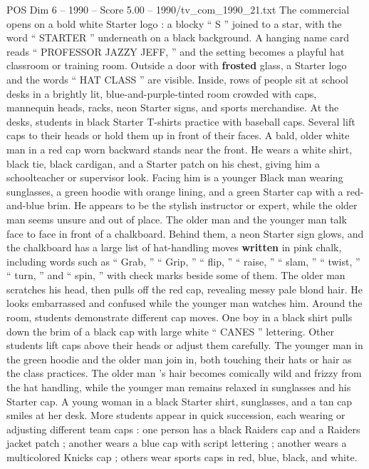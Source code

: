 \begin{textsample}{POS Dim 6 – 1990 – Score 5.00 – 1990/tv\_com\_1990\_21.txt}  \label{ex:f6_pos_080}
The commercial opens on a bold white Starter logo : a blocky “ S ” joined to a star, with the word “ STARTER ” underneath on a black background.
A hanging name card reads “ PROFESSOR JAZZY JEFF, ” and the setting becomes a playful hat classroom or training room.
Outside a door with \textbf{frosted} glass, a Starter logo and the words “ HAT CLASS ” are visible.
Inside, rows of people sit at school desks in a brightly lit, blue-and-purple-tinted room crowded with caps, mannequin heads, racks, neon Starter signs, and sports merchandise.
At the desks, students in black Starter T-shirts practice with baseball caps.
Several lift caps to their heads or hold them up in front of their faces.
A bald, older white man in a red cap worn backward stands near the front.
He wears a white shirt, black tie, black cardigan, and a Starter patch on his chest, giving him a schoolteacher or supervisor look.
Facing him is a younger Black man wearing sunglasses, a green hoodie with orange lining, and a green Starter cap with a red-and-blue brim.
He appears to be the stylish instructor or expert, while the older man seems unsure and out of place.
The older man and the younger man talk face to face in front of a chalkboard.
Behind them, a neon Starter sign glows, and the chalkboard has a large list of hat-handling moves \textbf{written} in pink chalk, including words such as “ Grab, ” “ Grip, ” “ flip, ” “ raise, ” “ slam, ” “ twist, ” “ turn, ” and “ spin, ” with check marks beside some of them.
The older man scratches his head, then pulls off the red cap, revealing messy pale blond hair.
He looks embarrassed and confused while the younger man watches him.
Around the room, students demonstrate different cap moves.
One boy in a black shirt pulls down the brim of a black cap with large white “ CANES ” lettering.
Other students lift caps above their heads or adjust them carefully.
The younger man in the green hoodie and the older man join in, both touching their hats or hair as the class practices.
The older man ’s hair becomes comically wild and frizzy from the hat handling, while the younger man remains relaxed in sunglasses and his Starter cap.
A young woman in a black Starter shirt, sunglasses, and a tan cap smiles at her desk.
More students appear in quick succession, each wearing or adjusting different team caps : one person has a black Raiders cap and a Raiders jacket patch ; another wears a blue cap with script lettering ; another wears a multicolored Knicks cap ; others wear sports caps in red, blue, black, and white.

\end{textsample}
